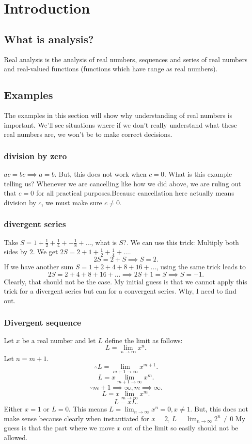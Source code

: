 \documentclass{report}
\begin{document}
\listoftodos

\chapter{Introduction}
\section{What is analysis?}
Real analysis is the analysis of real numbers, sequences and series of real numbers and real-valued functions (functions which have range as real numbers). 
\section{Examples}
The examples in this section will show why understanding of real numbers is important. We'll see situations where if we don't really understand what these real numbers are, we won't be to make correct decisions. 
\subsection{division by zero}
$ac = bc \implies a = b$. But, this does not work when $c= 0$. What is this example telling us? Whenever we are cancelling like how we did above, we are ruling out that $c =0 $ for all practical purposes.Because cancellation here actually means division by $c$, we must make sure $c \neq 0$. 
\subsection{divergent series}
Take $S = 1 + \frac{1}{2} + \frac{1}{4} + + \frac{1}{8} + \dots $, what is $S$?. We can use this trick: Multiply both sides by $2$. We get $2S = 2 + 1 + \frac{1}{2} + \frac{1}{4} + \dots$. 
\[
2S = 2 + S \implies S = 2 
.\] 
If we have another sum $S = 1 + 2 + 4 + 8 + 16 + \dots$, using the same trick leads to  \[
2S = 2 + 4 + 8 + 16 + \dots\implies 2S + 1 = S \implies S = -1
.\] 
Clearly, that should not be the case.  My initial guess is that we cannot apply this trick for a divergent series but can for a convergent series. Why, I need to find out.


\subsection{Divergent sequence}
Let $x$ be a real number and let $L$ define the limit as follows:
\[
L = \lim_{n\to \infty} x^{n} 
.\] 
Let $n = m + 1$. 
\[
\therefore L = \lim_{m+1 \to \infty} x^{m+1}  
.\] 
\[
L = x \lim_{m+1 \to \infty} x^{m}
.\]
\[
\because m+1 \implies \infty, m \implies \infty 
.\] 
\[
L = x \lim_{m \to \infty} x^{m}
.\] 
\[
L = xL 
.\] 
Either $x = 1$ or $L = 0$. 
This means $L = \lim_{n \to \infty} x^{n} = 0, x \neq 1$. But, this does not make sense because clearly when instantiated for $x = 2$, $L = \lim_{n \to \infty} 2^{n} \neq 0$ 
My guess is that the part where we move $x$ out of the limit so easily should not be allowed.
\end{document}
